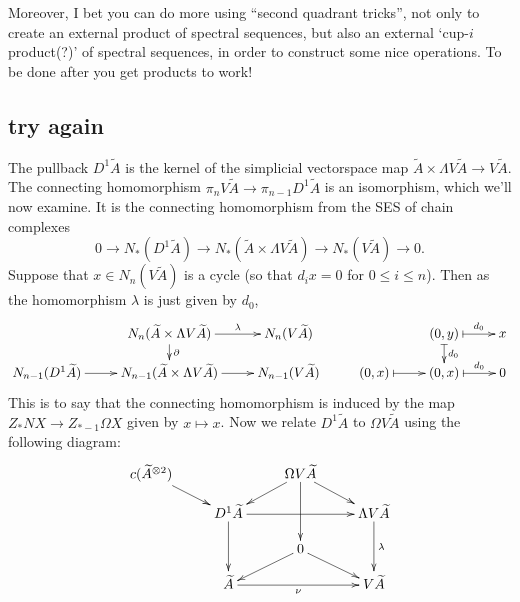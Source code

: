 \documentclass[10pt]{article}
\begin{document}
\begin{Thoughts on Adams Multiplicativity II}
Moreover, I bet you can do more using ``second quadrant tricks'', not only to create an external product of spectral sequences, but also an external `cup-$i$ product(?)' of spectral sequences, in order to construct some nice operations. To be done after you get products to work!





\subsection{try again}
The pullback $D^1\widetilde{A}$ is the kernel of the simplicial vectorspace map $\widetilde{A}\times \Lambda V\widetilde{A}\to V\widetilde{A}$.  The connecting homomorphism $\pi_n V\widetilde{A}\to \pi_{n-1}D^1\widetilde{A}$ is an isomorphism, which we'll now examine. It is the connecting homomorphism from the SES of chain complexes
\[0\to N_*(D^1\widetilde{A})\to N_*(\widetilde{A}\times \Lambda V\widetilde{A})\to N_* (V\widetilde{A})\to 0.\]
Suppose that $x\in N_n(V\widetilde{A})$ is a cycle (so that $d_ix=0$ for $0\leq i \leq n$). Then as the homomorphism $\lambda$ is just given by $d_0$, 
\[\xymatrix@R=4mm{
&%
N_n(\widetilde{A}\times \Lambda V\widetilde{A})\ar[r]^-{\lambda}
\ar[d]^-{\partial}
&%
N_n(V\widetilde{A})
&
&%
{(0,y)}\ar@{|->}[r]^-{d_0}
\ar@{|->}[d]^-{d_0}
&%
x
\\%
N_{n-1}(D^1\widetilde{A})\ar[r]
&%
N_{n-1}(\widetilde{A}\times \Lambda V\widetilde{A})\ar[r]&%
N_{n-1}(V\widetilde{A})
&
(0,x)\ar@{|->}[r]
&%
(0,x)\ar@{|->}@{|->}[r]^-{d_0}&%
0
}\]
This is to say that the connecting homomorphism is induced by the map $Z_*NX\to Z_{*-1}\Omega X$ given by $x\mapsto x$. Now we relate $D^1\widetilde{A}$ to $\Omega V\widetilde{A}$ using the following diagram:
\[\xymatrix@R=4mm{
c(\widetilde{A}^{\otimes 2})\ar[dr]
&%
&%
\Omega V\widetilde{A}\ar[dl]
\ar[dd]
\ar[dr]
&%
\\%
&%
D^1\widetilde{A}\ar[dd]
\ar[rr]
&%
&%
\Lambda V\widetilde{A}\ar[dd]^-{\lambda}
\\%
&%
&%
0\ar[dl]
\ar[rd]
&%
\\%
&%
\widetilde{A}\ar[rr]_-{\nu}
&%
&%
V\widetilde{A}%
}\]
\end{Thoughts on Adams Multiplicativity II}
\end{document}
